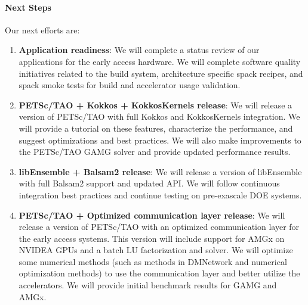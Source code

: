 \paragraph{Next Steps}

Our next efforts are:
\begin{enumerate}
  \item \textbf{Application readiness}: 
  We will complete a status review of our applications for the early access hardware.  We will 
  complete software quality initiatives related to the build system, architecture specific spack 
  recipes, and spack smoke tests for build and accelerator usage validation.
  \item \textbf{PETSc/TAO + Kokkos + KokkosKernels release}:
  We will release a version of PETSc/TAO with full Kokkos and KokkosKernels integration.  We will 
  provide a tutorial on these features, characterize the performance, and suggest optimizations 
  and best practices.  
  We will also make improvements to the PETSc/TAO GAMG solver and provide updated performance results.
  \item \textbf{libEnsemble + Balsam2 release}:
  We will release a version of libEnsemble with full Balsam2 support and updated API.
  We will follow continuous integration best practices and continue testing on pre-exascale DOE systems.
  \item \textbf{PETSc/TAO + Optimized communication layer release}:
  We will release a version of PETSc/TAO with an optimized communication layer for the early access systems.  
  This version will include support for AMGx on NVIDEA GPUs and a batch LU factorization and solver.
  We will optimize some numerical methods (such as methods in DMNetwork and numerical optimization methods) 
  to use the communication layer and better utilize the accelerators.
  We will provide initial benchmark results for GAMG and AMGx.
\end{enumerate}

